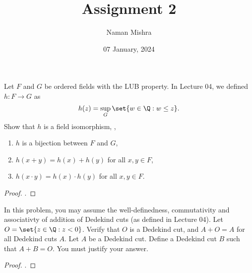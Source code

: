 \documentclass[12pt]{article}
\title{Assignment 2}
\author{Naman Mishra}
\date{07 January, 2024}
\begin{document}
\maketitle
\begin{problem*}
    Let $F$ and $G$ be ordered fields with the LUB property.
    In Lecture 04, we defined $h\colon F \to G$ as \[
        h(z) = \sup_G\set{w \in \Q : w \le z}.
    \] Show that $h$ is a field isomorphism, \ie,
    \begin{enumerate}[label=(\arabic*)]
        \item $h$ is a bijection between $F$ and $G$,
        \item $h(x + y) = h(x) + h(y)$ for all $x, y \in F$,
        \item $h(x \cdot y) = h(x) \cdot h(y)$ for all $x, y \in F$.
    \end{enumerate}
\end{problem*}
\begin{proof}
    .
\end{proof}

\begin{problem*}
    In this problem, you may assume the well-definedness, commutativity and
    associativty of addition of Dedekind cuts (as defined in Lecture 04).
    Let $O = \set{z \in \Q : z < 0}$.
    Verify that $O$ is a Dedekind cut, and $A + O = A$ for all Dedekind cuts
    $A$.
    Let $A$ be a Dedekind cut.
    Define a Dedekind cut $B$ such that $A + B = O$.
    You must justify your answer.
\end{problem*}
\begin{proof}
    .
\end{proof}
\end{document}
